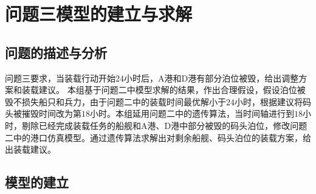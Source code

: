 \documentclass{whutmod}
\begin{document}
	  


     \section{问题三模型的建立与求解}
   	\subsection{问题的描述与分析}
   	问题三要求，当装载行动开始24小时后，A港和D港有部分泊位被毁，给出调整方案和装载建议。
   	本组基于问题二中模型求解的结果，作出合理假设，假设泊位被毁不损失船只和兵力，由于问题二中的装载时间最优解小于$24$小时，根据建议将码头被摧毁时间改为第$18$小时。本组延用问题二中的遗传算法，当时间轴进行到$18$小时，剔除已经完成装载任务的船舰和A港、D港中部分被毁的码头泊位，修改问题二中的港口仿真模型。通过遗传算法求解出对剩余船舰、码头泊位的装载方案，给出装载建议。
  \subsection{模型的建立}
\end{document}
